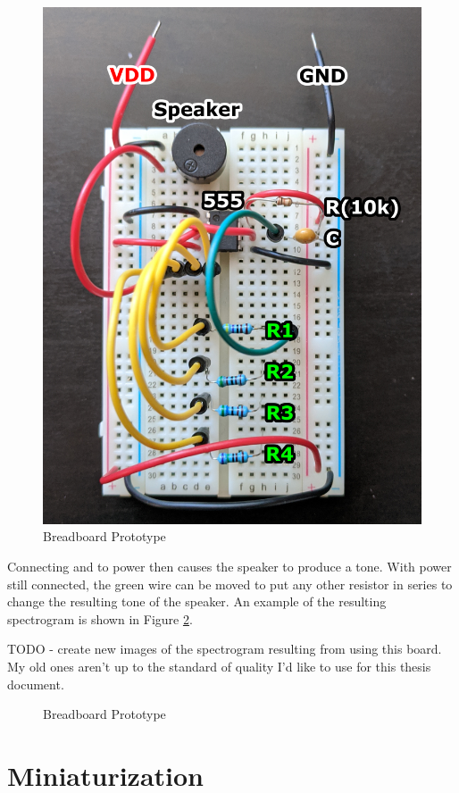 \begin{figure}[h]
    \centering
    \caption{Breadboard Prototype}
    \label{fig:breadboard}
    \includegraphics[width=.8\linewidth]{Figures/6 PCB Design/breadboard.png}
\end{figure}

Connecting  and  to power then causes the speaker
to produce a tone. With power still connected, the green wire can be
moved to put any other resistor in series to change the resulting tone
of the speaker. An example of the resulting spectrogram is shown in
Figure \ref{fig:breadboard-spectrogram}.

TODO - create new images of the spectrogram resulting from using this
board. My old ones aren't up to the standard of quality I'd like to use
for this thesis document.

\begin{figure}[h]
    \centering
    \caption{Breadboard Prototype}
    \label{fig:breadboard-spectrogram}
\end{figure}


\section{Miniaturization}

